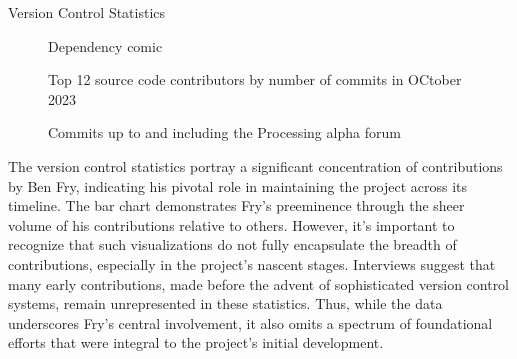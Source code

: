 \cleardoublepage
\changepapersize{305.3mm:210mm}

{
	\LARGE
	\noindent Version Control Statistics
}

\vfill

\noindent
	\begin{minipage}[t]{0.15\textwidth}
		\noindent
		\begin{figure}[H]
			\caption{Dependency comic}
			\label{fig:dependency_comic}
		\end{figure}
	\end{minipage}
	\hspace{2mm}
	\begin{minipage}[t]{0.442\textwidth}
		\begin{figure}[H]
			\frame{}
			\caption[Top souce code contributors]{Top 12 source code contributors by number of commits in OCtober 2023}
			\label{fig:top12-github}
		\end{figure}
	\end{minipage}
\vspace{0.1cm}
\begin{figure}[H]
	\frame{}
	\caption{Commits up to and including the Processing alpha forum}
	\label{fig:alpha-commits}
\end{figure}

\begin{multicols}{3}
	\noindent	
	The version control statistics portray a significant concentration of contributions by Ben Fry, indicating his pivotal role in maintaining the project across its timeline. The bar chart demonstrates Fry's preeminence through the sheer volume of his contributions relative to others. However, it's important to recognize that such visualizations do not fully encapsulate the breadth of contributions, especially in the project's nascent stages. Interviews suggest that many early contributions, made before the advent of sophisticated version control systems, remain unrepresented in these statistics. Thus, while the data underscores Fry's central involvement, it also omits a spectrum of foundational efforts that were integral to the project's initial development.
	\vfill\null
\end{multicols}


